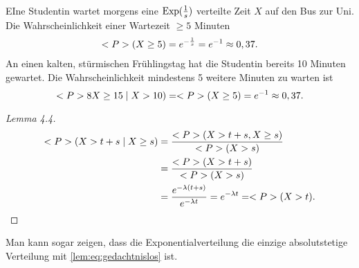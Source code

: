 \begin{example}
	EIne Studentin wartet morgens eine $\EXP(\frac{1}{s})$ verteilte Zeit $X$ auf den Bus zur Uni. Die Wahrscheinlichkeit einer Wartezeit $\ge 5$ Minuten
	\begin{align*}
		\P(X \ge 5) = e^{-\frac{1}{s}} = e^{-1} \approx 0,37.
	\end{align*}
	An einen kalten, stürmischen Frühlingstag hat die Studentin bereits 10 Minuten gewartet. Die Wahrscheinlichkeit mindestens 5 weitere Minuten zu warten ist
	\[
		\P8X\ge 15 \mid X > 10) = \P(X\ge 5) = e^{-1} \approx 0,37.
	\]
\end{example}
\begin{proof}[Lemma 4.4]
	\begin{align*}
		\P(X > t+s \mid X \ge s) &= \frac{\P(X> t+s, X \ge s)}{\P(X > s)}\\
		&= \frac{\P(X > t+s)}{\P(X > s)}\\
		&= \frac{e^{-\lambda(t+s)}}{e^{-\lambda t}} = e^{-\lambda t} = \P(X> t).
	\end{align*}
\end{proof}
\begin{hinweis}
	Man kann sogar zeigen, dass die Exponentialverteilung die einzige absolutstetige Verteilung mit \eqref{lem:eq:gedachtnislos} ist.
\end{hinweis}